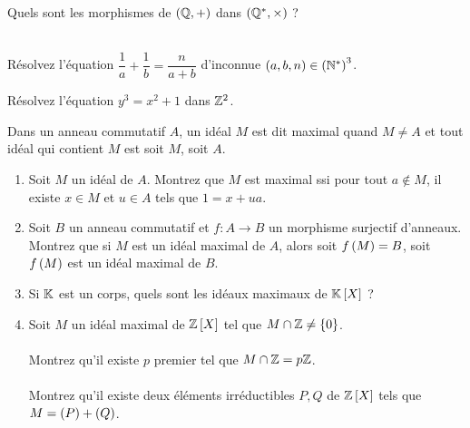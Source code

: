 \begin{exo}[Oral X, 10]
Quels sont les morphismes de \(\groupe{\Q}\) dans \(\groupe{\Qs}[\times]\) ?
\end{exo}

\begin{exo}[Oral X, 11]~\\
Résolvez l'équation \(\dfrac{1}{a}+\dfrac{1}{b}=\dfrac{n}{a+b}\) d'inconnue \(\left(a,b,n\right)\in\left(\mathbb{N}^*\right)^3\).
\end{exo}

\begin{exo}
Résolvez l'équation \(y^3=x^2+1\) dans \(\mathbb{Z}^2\).
\end{exo}

\begin{exo}
Dans un anneau commutatif \(A\), un idéal \(M\) est dit maximal quand \(M\not=A\) et tout idéal qui contient \(M\) est soit \(M\), soit \(A\).

\begin{enumerate}
    \item Soit \(M\) un idéal de \(A\). Montrez que \(M\) est maximal ssi pour tout \(a\not\in M\), il existe \(x\in M\) et \(u\in A\) tels que \(1=x+ua\). \\
    \item Soit \(B\) un anneau commutatif et \(f:A\to B\) un morphisme surjectif d'anneaux. Montrez que si \(M\) est un idéal maximal de \(A\), alors soit \(f\left(M\right)=B\), soit \(f\left(M\right)\) est un idéal maximal de \(B\). \\
    \item Si \(\mathbb{K}\) est un corps, quels sont les idéaux maximaux de \(\poly\) ? \\
    \item Soit \(M\) un idéal maximal de \(\poly[\Z]\) tel que \(M\cap\mathbb{Z}\not=\left\lbrace0\right\rbrace\). \\\\ Montrez qu'il existe \(p\) premier tel que \(M\cap\mathbb{Z}=p\mathbb{Z}\). \\\\ Montrez qu'il existe deux éléments irréductibles \(P,Q\) de \(\poly[\Z]\) tels que \(M=\left(P\right)+\left(Q\right)\).
\end{enumerate}
\end{exo}
